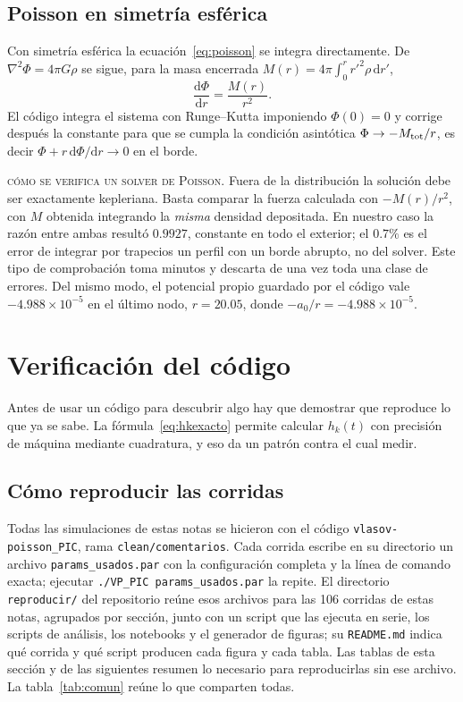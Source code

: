 \documentclass[11pt,a4paper]{article}
\newcommand{\dd}{\mathrm{d}}
\theoremstyle{definition}
\begin{document}
\subsection{Poisson en simetría esférica}

Con simetría esférica la ecuación~\eqref{eq:poisson} se integra directamente. De
$\nabla^2\Phi = 4\pi G\rho$ se sigue, para la masa encerrada
$M(r)=4\pi\int_0^r r'^2\rho\,\dd r'$,
\begin{equation}
  \frac{\dd\Phi}{\dd r} = \frac{M(r)}{r^2}.
\end{equation}
El código integra el sistema con Runge--Kutta imponiendo $\Phi(0)=0$ y corrige
después la constante para que se cumpla la condición asintótica $\Phi \to -M_{\rm
tot}/r$, es decir $\Phi + r\,\dd\Phi/\dd r \to 0$ en el borde.

\begin{aviso}
\textsc{cómo se verifica un solver de Poisson.} Fuera de la distribución la
solución debe ser exactamente kepleriana. Basta comparar la fuerza calculada con
$-M(r)/r^2$, con $M$ obtenida integrando la \emph{misma} densidad depositada. En
nuestro caso la razón entre ambas resultó $0.9927$, constante en todo el exterior;
el $0.7\%$ es el error de integrar por trapecios un perfil con un borde abrupto,
no del solver. Este tipo de comprobación toma minutos y descarta de una vez toda una
clase de errores. Del mismo modo, el potencial propio guardado por el código vale
$-4.988\times10^{-5}$ en el último nodo, $r=20.05$, donde $-a_0/r=-4.988\times10^{-5}$.
\end{aviso}

\section{Verificación del código}
\label{sec:verificacion}

Antes de usar un código para descubrir algo hay que demostrar que reproduce lo que
ya se sabe. La fórmula~\eqref{eq:hkexacto} permite calcular $h_k(t)$ con precisión
de máquina mediante cuadratura, y eso da un patrón contra el cual medir.

\subsection{Cómo reproducir las corridas}
\label{sec:reproducir}

Todas las simulaciones de estas notas se hicieron con el código
\texttt{vlasov-poisson\_PIC}, rama \texttt{clean/comentarios}. Cada corrida escribe
en su directorio un archivo \texttt{params\_usados.par} con la configuración completa
y la línea de comando exacta; ejecutar \texttt{./VP\_PIC params\_usados.par} la
repite. El directorio \texttt{reproducir/} del repositorio reúne esos archivos para las
106 corridas de estas notas, agrupados por sección, junto con un script que las
ejecuta en serie, los scripts de análisis, los notebooks y el generador de figuras; su
\texttt{README.md} indica qué corrida y qué script producen cada figura y cada tabla. Las tablas de esta sección y de las siguientes resumen lo necesario para
reproducirlas sin ese archivo. La tabla~\ref{tab:comun} reúne lo que comparten todas.
\end{document}
